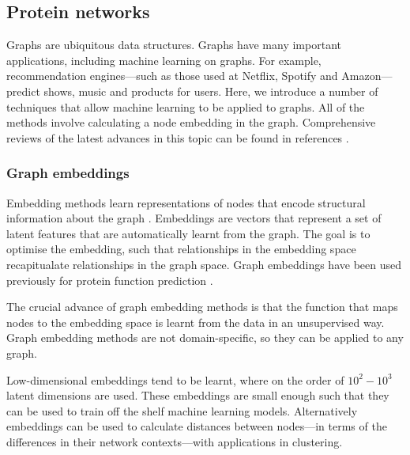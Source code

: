 \subsection{Protein networks}

Graphs are ubiquitous data structures. Graphs have many important applications, including machine learning on graphs. For example, recommendation engines---such as those used at Netflix, Spotify and Amazon---predict shows, music and products for users. Here, we introduce a number of techniques that allow machine learning to be applied to graphs. All of the methods involve calculating a node embedding in the graph. Comprehensive reviews of the latest advances in this topic can be found in references \cite{Hamilton2017,Cai2017}.


\subsubsection{Graph embeddings}
\label{sec:intro-graph-embeddings}

Embedding methods learn representations of nodes that encode structural information about the graph \cite{Hamilton2017}. Embeddings are vectors that represent a set of latent features that are automatically learnt from the graph. The goal is to optimise the embedding, such that relationships in the embedding space recapitualate relationships in the graph space. Graph embeddings have been used previously for protein function prediction \cite{Cho2016,Gligorijevic2018}.

The crucial advance of graph embedding methods is that the function that maps nodes to the embedding space is learnt from the data in an unsupervised way. Graph embedding methods are not domain-specific, so they can be applied to any graph.

Low-dimensional embeddings tend to be learnt, where on the order of $10^2-10^3$ latent dimensions are used. These embeddings are small enough such that they can be used to train off the shelf machine learning models. Alternatively embeddings can be used to calculate distances between nodes---in terms of the differences in their network contexts---with applications in clustering.

